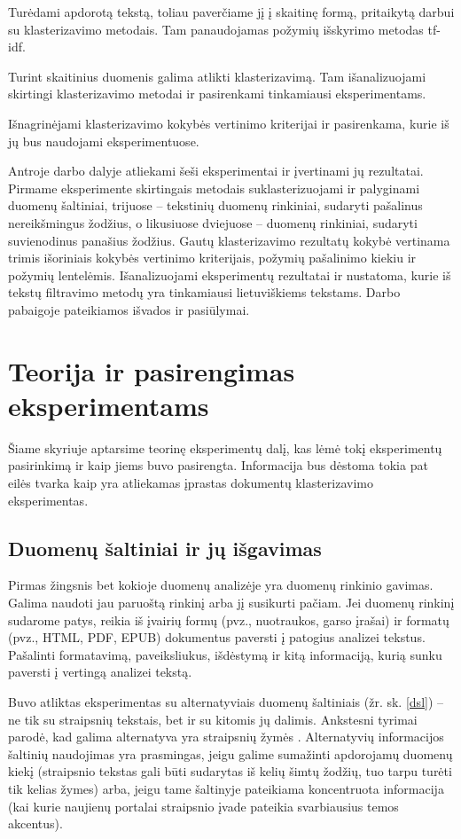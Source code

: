 \documentclass{VUMIFInfBakalaurinis}
\begin{document}
Turėdami apdorotą tekstą, toliau paverčiame jį į skaitinę formą,
  pritaikytą darbui su klasterizavimo metodais. Tam panaudojamas požymių
  išskyrimo metodas tf-idf.

Turint skaitinius duomenis galima atlikti klasterizavimą. Tam
  išanalizuojami skirtingi klasterizavimo metodai ir pasirenkami
  tinkamiausi eksperimentams.

Išnagrinėjami klasterizavimo kokybės vertinimo kriterijai ir
  pasirenkama, kurie iš jų bus naudojami eksperimentuose.


Antroje darbo dalyje atliekami šeši eksperimentai ir įvertinami jų
rezultatai. Pirmame eksperimente skirtingais metodais suklasterizuojami
ir palyginami duomenų šaltiniai, trijuose -- tekstinių duomenų
rinkiniai, sudaryti pašalinus nereikšmingus žodžius, o likusiuose
dviejuose -- duomenų rinkiniai, sudaryti suvienodinus panašius žodžius.
Gautų klasterizavimo rezultatų kokybė vertinama trimis išoriniais kokybės vertinimo
kriterijais, požymių pašalinimo kiekiu ir požymių lentelėmis.
Išanalizuojami eksperimentų rezultatai ir nustatoma, kurie iš tekstų
filtravimo metodų yra tinkamiausi lietuviškiems tekstams. Darbo pabaigoje pateikiamos išvados ir pasiūlymai.

\section{Teorija ir pasirengimas eksperimentams}

Šiame skyriuje aptarsime teorinę eksperimentų dalį, kas lėmė tokį
eksperimentų pasirinkimą ir kaip jiems buvo pasirengta.
Informacija bus dėstoma tokia pat eilės tvarka kaip yra atliekamas
įprastas dokumentų klasterizavimo eksperimentas.

\subsection{Duomenų šaltiniai ir jų išgavimas}

Pirmas žingsnis bet kokioje duomenų analizėje yra duomenų rinkinio
gavimas. Galima naudoti jau paruoštą rinkinį arba jį susikurti pačiam.
Jei duomenų rinkinį sudarome patys, reikia iš įvairių formų (pvz.,
nuotraukos, garso įrašai) ir formatų (pvz., HTML, PDF, EPUB) dokumentus
paversti į patogius analizei tekstus. Pašalinti formatavimą,
paveiksliukus, išdėstymą ir kitą informaciją, kurią sunku paversti į
vertingą analizei tekstą.

Buvo atliktas eksperimentas su alternatyviais duomenų
šaltiniais (žr. sk. \ref{dsl}) -- ne tik su straipsnių
tekstais, bet ir su kitomis jų dalimis. Ankstesni tyrimai parodė, kad
galima alternatyva yra straipsnių žymės \cite{vzalinauskas2006individualiai}.
Alternatyvių informacijos šaltinių naudojimas yra prasmingas, jeigu
galime sumažinti apdorojamų duomenų kiekį (straipsnio tekstas gali būti
sudarytas iš kelių šimtų žodžių, tuo tarpu turėti tik kelias žymes)
arba, jeigu tame šaltinyje pateikiama koncentruota informacija (kai kurie
naujienų portalai straipsnio įvade pateikia svarbiausius temos
akcentus).
\end{document}
